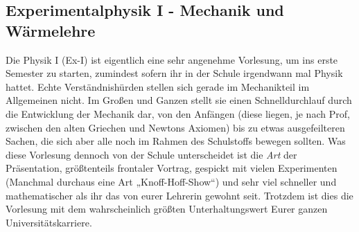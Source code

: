 \subsection{Experimentalphysik I - Mechanik und Wärmelehre}
\label{ex1}

Die Physik I (Ex-I) ist eigentlich eine sehr angenehme Vorlesung, um ins erste Semester zu starten, zumindest sofern ihr in der Schule irgendwann mal Physik hattet. Echte Verständnishürden stellen sich gerade im Mechanikteil im Allgemeinen nicht. Im Großen und Ganzen stellt sie einen Schnelldurchlauf durch die Entwicklung der Mechanik dar, von den Anfängen (diese liegen, je nach Prof, zwischen den alten Griechen und Newtons Axiomen) bis zu etwas ausgefeilteren Sachen, die sich aber alle noch im Rahmen des Schulstoffs bewegen sollten. Was diese Vorlesung dennoch von der Schule unterscheidet ist die \emph{Art} der Präsentation, größtenteils frontaler Vortrag, gespickt mit vielen Experimenten (Manchmal durchaus eine Art „Knoff-Hoff-Show“) und sehr viel schneller und mathematischer als ihr das von eurer Lehrerin gewohnt seit. Trotzdem ist dies die Vorlesung mit dem wahrscheinlich größten Unterhaltungswert Eurer ganzen Universitätskarriere.

